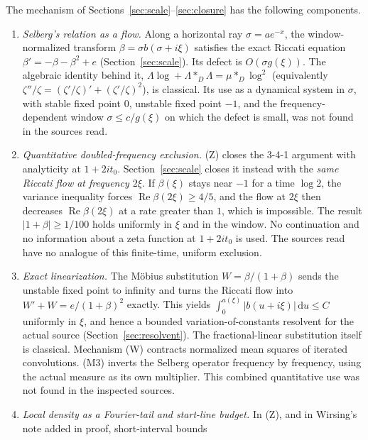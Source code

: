\documentclass[11pt,letterpaper]{article}
\numberwithin{equation}{section}
\theoremstyle{definition}
\theoremstyle{remark}
\newcommand{\dd}{\,\mathrm d}
\newcommand{\Rea}{\operatorname{Re}}
\begin{document}
The mechanism of Sections~\ref{sec:scale}--\ref{sec:closure} has the
following components.
\begin{enumerate}
 \item[(M1)] \emph{Selberg's relation as a flow.} Along a horizontal ray
       $\sigma=ae^{-x}$, the window-normalized transform
       $\beta=\sigma b(\sigma+i\xi)$ satisfies the exact Riccati equation
       $\beta'=-\beta-\beta^2+e$ (Section~\ref{sec:scale}). Its defect is
       $O(\sigma g(\xi))$. The algebraic identity behind it,
       $\Lambda\log+\Lambda*_D\Lambda=\mu*_D\log^2$ (equivalently
       $\zeta''/\zeta=(\zeta'/\zeta)'+(\zeta'/\zeta)^2$), is classical.
       Its use as a dynamical system in $\sigma$, with stable fixed point
       $0$, unstable fixed point $-1$, and the frequency-dependent window
       $\sigma\le c/g(\xi)$ on which the defect is small, was not found in
       the sources read.
 \item[(M2)] \emph{Quantitative doubled-frequency exclusion.} (Z) closes the
       3-4-1 argument with analyticity at $1+2it_0$. Section~\ref{sec:scale}
       closes it instead with the \emph{same Riccati flow at frequency
       $2\xi$}. If $\beta(\xi)$ stays near $-1$ for a time $\log 2$, the
       variance inequality forces $\Rea\beta(2\xi)\ge4/5$, and the flow at
       $2\xi$ then decreases $\Rea\beta(2\xi)$ at a rate greater than $1$,
       which is impossible. The result $|1+\beta|\ge1/100$ holds uniformly
       in $\xi$ and in the window. No continuation and no information about
       a zeta function at $1+2it_0$ is used. The sources read have no
       analogue of this finite-time, uniform exclusion.
 \item[(M3)] \emph{Exact linearization.} The M\"obius substitution
       $W=\beta/(1+\beta)$ sends the unstable fixed point to infinity and
       turns the Riccati flow into $W'+W=e/(1+\beta)^2$ exactly. This
       yields $\int_0^{a(\xi)}|b(u+i\xi)|\dd u\le C$ uniformly in $\xi$, and
       hence a bounded variation-of-constants resolvent for the actual
       source (Section~\ref{sec:resolvent}). The fractional-linear
       substitution itself is classical. Mechanism (W) contracts
       normalized mean squares of iterated convolutions. (M3) inverts the
       Selberg operator frequency by frequency, using the actual measure
       as its own multiplier. This combined quantitative use was not
       found in the inspected sources.
 \item[(M4)] \emph{Local density as a Fourier-tail and start-line budget.}
       In (Z), and in Wirsing's note added in proof, short-interval bounds

\end{enumerate}
\end{document}
